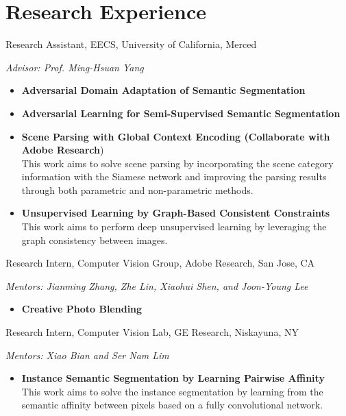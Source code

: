 \documentclass[11pt,letterpaper,sans]{moderncv} %
\begin{document}

\section{Research Experience}

%
{Research Assistant, EECS, University of California, Merced}
{}{}{}
{
	\textit{Advisor: Prof. Ming-Hsuan Yang}
	\begin{itemize}
		\item \textbf{Adversarial Domain Adaptation of Semantic Segmentation}
		\item \textbf{Adversarial Learning for Semi-Supervised Semantic Segmentation}
		\item \textbf{Scene Parsing with Global Context Encoding (Collaborate with Adobe Research})\\
		This work aims to solve scene parsing by incorporating the scene category information with the Siamese network and improving the parsing results through both parametric and non-parametric methods.
		\item \textbf{Unsupervised Learning by Graph-Based Consistent Constraints}\\
		This work aims to perform deep unsupervised learning by leveraging the graph consistency between images.
	\end{itemize}
}

%
{Research Intern, Computer Vision Group, Adobe Research, San Jose, CA}
{}{}{}
{
	\textit{Mentors: Jianming Zhang, Zhe Lin, Xiaohui Shen, and Joon-Young Lee}
	\begin{itemize}
		\item \textbf{Creative Photo Blending} 
	\end{itemize} 
}

%
{Research Intern, Computer Vision Lab, GE Research, Niskayuna, NY}
{}{}{}
{
	\textit{Mentors: Xiao Bian and Ser Nam Lim}
	\begin{itemize}
		\item \textbf{Instance Semantic Segmentation by Learning Pairwise Affinity} \\
		This work aims to solve the instance segmentation by learning from the semantic affinity between pixels based on a fully convolutional network.
	\end{itemize}
}
\end{document}
